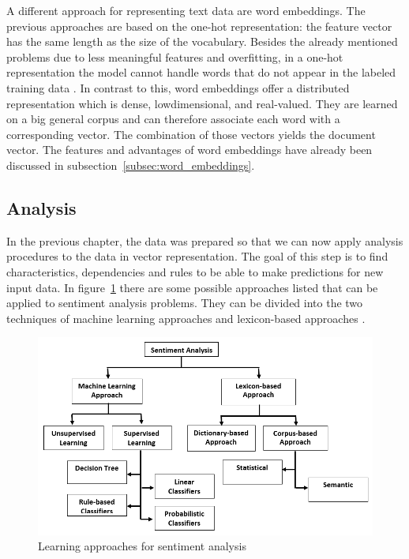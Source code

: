 \documentclass[article,type=msc,colorback,accentcolor=tud7b]{tudthesis}
\begin{document}
    A different approach for representing text data are word embeddings. The previous approaches are based on the one-hot representation: the feature vector has the same length as the size of the vocabulary. Besides the already mentioned problems due to less meaningful features and overfitting, in a one-hot representation the model cannot handle words that do not appear in the labeled training data \autocite{Turian2010}. In contrast to this, word embeddings offer a distributed representation which is dense, lowdimensional, and real-valued. They are learned on a big general corpus and can therefore associate each word with a corresponding vector. The combination of those vectors yields the document vector. The features and advantages of word embeddings have already been discussed in subsection~\ref{subsec:word_embeddings}.

  \subsection{Analysis}
  \label{subsec:analysis}
    In the previous chapter, the data was prepared so that we can now apply analysis procedures to the data in vector representation. The goal of this step is to find characteristics, dependencies and rules to be able to make predictions for new input data. In figure~\ref{fig:learning_approaches_sentiment_analysis} there are some possible approaches listed that can be applied to sentiment analysis problems. They can be divided into the two techniques of machine learning approaches and lexicon-based approaches \autocite{Kharde2016}.
    
    \begin{figure}[H]
      \centering
      \includegraphics[scale=0.5]{images/learning_approaches_sentiment_analysis}
      \caption[Learning approaches for sentiment analysis]{Learning approaches for sentiment analysis \autocite{Halibas2018}\protect\footnotemark}
      \label{fig:learning_approaches_sentiment_analysis}
    \end{figure}
    
\end{document}
